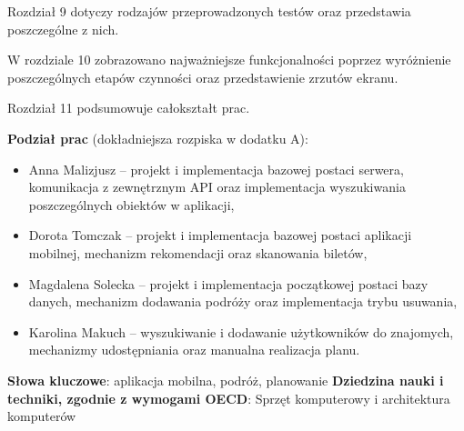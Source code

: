 \par Rozdział 9 dotyczy rodzajów przeprowadzonych testów oraz przedstawia poszczególne z nich.

\par W rozdziale 10 zobrazowano najważniejsze funkcjonalności poprzez wyróżnienie poszczególnych etapów czynności oraz przedstawienie zrzutów ekranu. 

\par Rozdział 11 podsumowuje całokształt prac.

\par \textbf{Podział prac} (dokładniejsza rozpiska w dodatku A):
\begin{itemize}
\item Anna Malizjusz --  projekt i implementacja bazowej postaci serwera, komunikacja z zewnętrznym API oraz implementacja wyszukiwania poszczególnych obiektów w aplikacji,
\item Dorota Tomczak -- projekt i implementacja bazowej postaci aplikacji mobilnej, mechanizm rekomendacji oraz skanowania biletów,
\item Magdalena Solecka -- projekt i implementacja początkowej postaci bazy danych, mechanizm dodawania podróży oraz implementacja trybu usuwania,
\item Karolina Makuch -- wyszukiwanie i dodawanie użytkowników do znajomych, mechanizmy udostępniania oraz manualna realizacja planu.
\end{itemize}
\textbf{Słowa kluczowe}: aplikacja mobilna, podróż, planowanie
\newline\textbf{Dziedzina nauki i techniki, zgodnie z wymogami OECD}: Sprzęt komputerowy i architektura komputerów
